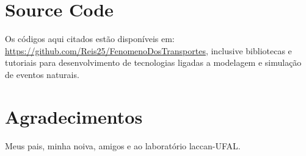 \documentclass[letterpaper, 10 pt, conference]{ieeeconf}
\newcommand*\GitHubLoc{https://github.com/Reis25/FenomenoDosTransportes}
\begin{document}
\section{Source Code}

Os códigos aqui citados estão disponíveis em: \url{\GitHubLoc}, inclusive bibliotecas e tutoriais para desenvolvimento de 
tecnologias ligadas a modelagem e simulação de eventos naturais.





\section{Agradecimentos}

Meus pais, minha noiva, amigos e ao laboratório laccan-UFAL.

\clearpage
\end{document}
